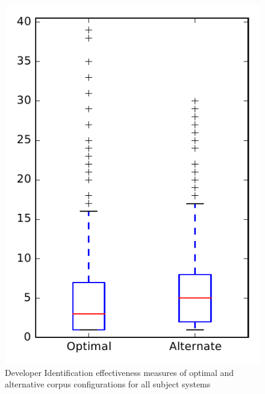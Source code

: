 
\begin{figure}
\centering
\includegraphics[height=0.4\textheight]{figures/combo/dit_rq2_overview}
\caption{Developer Identification effectiveness measures of optimal and alternative corpus configurations for all subject systems}
\label{fig:combo:dit:rq2:overview}
\end{figure}
